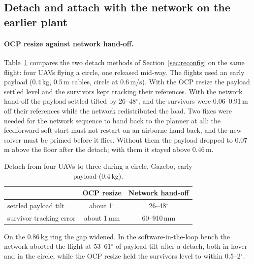 
\subsection{Detach and attach with the network on the earlier plant}
\label{sec:app_network_results}

\paragraph{OCP resize against network hand-off.} Table~\ref{tab:detach_ab} compares the two detach
methods of Section~\ref{sec:reconfig} on the same flight: four UAVs flying a circle, one released
mid-way. The flights used an early payload (0.4\,kg, 0.5\,m cables, circle at 0.6\,m/s). With the OCP
resize the payload settled level and the survivors kept tracking their references. With the network
hand-off the payload settled tilted by 26--48$^\circ$, and the survivors were 0.06--0.91\,m off their
references while the network redistributed the load. Two fixes were needed for the network sequence
to hand back to the planner at all: the feedforward soft-start must not restart on an airborne
hand-back, and the new solver must be primed before it flies. Without them the payload dropped to
0.07\,m above the floor after the detach; with them it stayed above 0.46\,m.

\begin{table}[h]
\centering
\caption{Detach from four UAVs to three during a circle, Gazebo, early payload (0.4\,kg).}
\label{tab:detach_ab}
\begin{tabular}{lcc}
\toprule
 & OCP resize & Network hand-off \\
\midrule
settled payload tilt & about 1$^\circ$ & 26--48$^\circ$ \\
survivor tracking error & about 1\,mm & 60--910\,mm \\
\bottomrule
\end{tabular}
\end{table}

On the 0.86\,kg ring the gap widened. In the software-in-the-loop bench the network aborted the
flight at 53--61$^\circ$ of payload tilt after a detach, both in hover and in the circle, while the
OCP resize held the survivors level to within 0.5--2$^\circ$.

